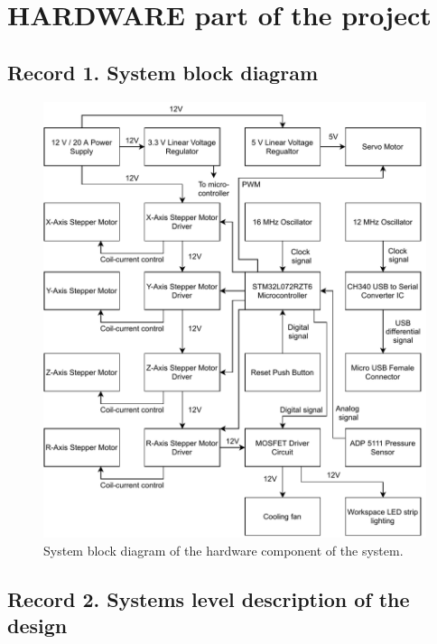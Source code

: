 
\section{HARDWARE part of the project}

\subsection{Record 1. System block diagram}

\begin{figure}[!ht]
	\centering
	\includegraphics[scale=1]{figures/system-diagram.pdf}
	\caption{System block diagram of the hardware component of the system.}
	\label{fig:system-diagram}
\end{figure}

\newpage

\subsection{Record 2.  Systems level description of the design}

